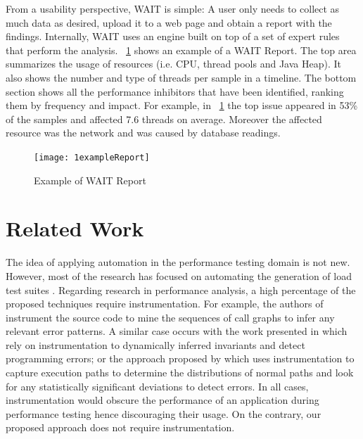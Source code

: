 \documentclass[runningheads,a4paper]{llncs}
\begin{document}
From a usability perspective, WAIT is simple: A user only needs to collect as
much data as desired, upload it to a web page and obtain a report with the
findings. Internally, WAIT uses an engine built on top of a set of expert rules
that perform the analysis. \figurename ~\ref{fig_WAITReport} shows an example of
a WAIT Report. The top area summarizes the usage of resources (i.e. CPU, thread
pools and Java Heap). It also shows the number and type of threads per sample in
a timeline. The bottom section shows all the performance inhibitors that have
been identified, ranking them by frequency and impact. For example, in
\figurename ~\ref{fig_WAITReport} the top issue appeared in 53\% of the samples
and affected 7.6 threads on average. Moreover the affected resource was the
network and was caused by database readings.
\vspace{-5pt}
\begin{figure}[!h]
\texttt{[image: 1exampleReport]}
\caption{Example of WAIT Report}
\label{fig_WAITReport}
\end{figure}

\vspace{-2pt}
\section{Related Work}
\vspace{-5pt}
The idea of applying automation in the performance testing domain is not new.
However, most of the research has focused on automating the generation of load
test suites
\cite{Chen1,Elvira1,Zhang1,Briand1,Bayan1,Avritzer2,Avritzer3,Garousi1}.
Regarding research in performance analysis, a high percentage of the proposed
techniques require instrumentation. For example, the authors of \cite{Yang1}
instrument the source code to mine the sequences of call graphs to infer any
relevant error patterns. A similar case occurs with the work presented in
\cite{Hangal1,Csallner1} which rely on instrumentation to dynamically inferred
invariants and detect programming errors; or the approach proposed by
\cite{Chen2} which uses instrumentation to capture execution paths to determine the distributions of normal paths and look for any statistically
significant deviations to detect errors. In all cases, instrumentation would obscure the
performance of an application during performance testing hence discouraging their usage.
On the contrary, our proposed approach does not require instrumentation.
\end{document}
